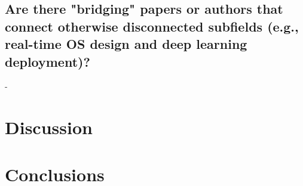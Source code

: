 \documentclass{article}
\begin{document}
\subsection{Are there "bridging" papers or authors that connect otherwise disconnected subfields (e.g., real-time OS design and deep learning deployment)?}
    -

\section{Discussion}


\section{Conclusions}




\end{document}

